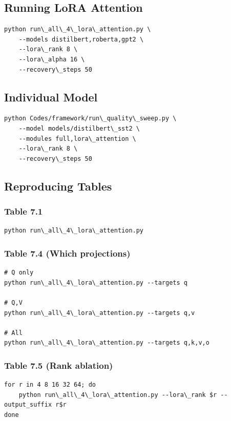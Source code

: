 \subsection{Running LoRA Attention}

\begin{lstlisting}
python run\_all\_4\_lora\_attention.py \
    --models distilbert,roberta,gpt2 \
    --lora\_rank 8 \
    --lora\_alpha 16 \
    --recovery\_steps 50
\end{lstlisting}

\subsection{Individual Model}

\begin{lstlisting}
python Codes/framework/run\_quality\_sweep.py \
    --model models/distilbert\_sst2 \
    --modules full,lora\_attention \
    --lora\_rank 8 \
    --recovery\_steps 50
\end{lstlisting}

\subsection{Reproducing Tables}

\subsubsection{Table 7.1}
\begin{lstlisting}
python run\_all\_4\_lora\_attention.py
\end{lstlisting}

\subsubsection{Table 7.4 (Which projections)}
\begin{lstlisting}
# Q only
python run\_all\_4\_lora\_attention.py --targets q

# Q,V
python run\_all\_4\_lora\_attention.py --targets q,v

# All
python run\_all\_4\_lora\_attention.py --targets q,k,v,o
\end{lstlisting}

\subsubsection{Table 7.5 (Rank ablation)}
\begin{lstlisting}
for r in 4 8 16 32 64; do
    python run\_all\_4\_lora\_attention.py --lora\_rank $r --output_suffix r$r
done
\end{lstlisting}

